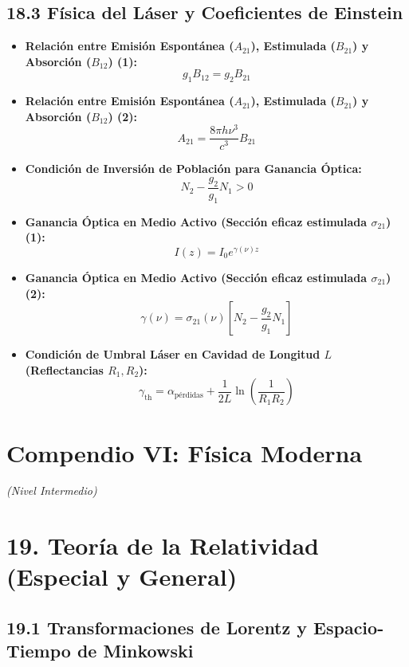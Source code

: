 \documentclass[11pt,a4paper]{article}
\begin{document}
\subsection*{18.3 Física del Láser y Coeficientes de Einstein}

\begin{itemize}
  \item \textbf{Relación entre Emisión Espontánea ($A_{21}$), Estimulada ($B_{21}$) y Absorción ($B_{12}$) (1):}
  \[
    g_1 B_{12} = g_2 B_{21}
  \]
  \item \textbf{Relación entre Emisión Espontánea ($A_{21}$), Estimulada ($B_{21}$) y Absorción ($B_{12}$) (2):}
  \[
    A_{21} = \frac{8\pi h \nu^3}{c^3} B_{21}
  \]
  \item \textbf{Condición de Inversión de Población para Ganancia Óptica:}
  \[
    N_2 - \frac{g_2}{g_1} N_1 > 0
  \]
  \item \textbf{Ganancia Óptica en Medio Activo (Sección eficaz estimulada $\sigma_{21}$) (1):}
  \[
    I(z) = I_0 e^{\gamma(\nu) z}
  \]
  \item \textbf{Ganancia Óptica en Medio Activo (Sección eficaz estimulada $\sigma_{21}$) (2):}
  \[
    \gamma(\nu) = \sigma_{21}(\nu)\left[ N_2 - \frac{g_2}{g_1} N_1 \right]
  \]
  \item \textbf{Condición de Umbral Láser en Cavidad de Longitud $L$ (Reflectancias $R_1, R_2$):}
  \[
    \gamma_{\mathrm{th}} = \alpha_{\text{pérdidas}} + \frac{1}{2L}\ln\left( \frac{1}{R_1 R_2} \right)
  \]
\end{itemize}

\section*{Compendio VI: Física Moderna}

\textit{(Nivel Intermedio)}

\section*{19. Teoría de la Relatividad (Especial y General)}

\subsection*{19.1 Transformaciones de Lorentz y Espacio-Tiempo de Minkowski}
\end{document}
